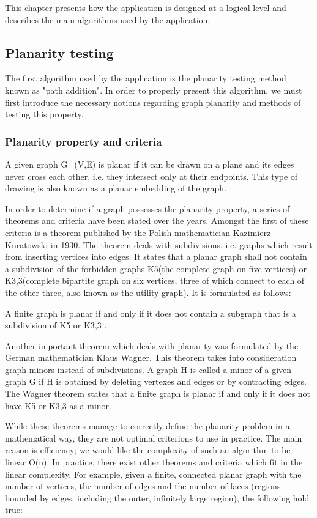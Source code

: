 This chapter presents how the application is designed at a logical level and describes the 
main algorithms used by the application.

\subsection{Planarity testing}

The first algorithm used by the application is the planarity testing method known as "path addition". In 
order to properly present this algorithm, we must first introduce the necessary notions regarding graph planarity 
and methods of testing this property.

\subsubsection{Planarity property and criteria}

A given graph G=(V,E) is planar if it can be drawn on a plane and its edges never cross each other, i.e. they 
intersect only at their endpoints. This type of drawing is also known as a planar embedding of the graph.

In order to determine if a graph possesses the planarity property, a series of theorems and criteria have been 
stated over the years. Amongst the first of these criteria is a theorem published by the Polish mathematician 
Kazimierz Kuratowski in 1930. The theorem deals with subdivisions, i.e. graphs which result from inserting vertices 
into edges. It states that a planar graph shall not contain a subdivision of the forbidden graphs K5(the complete 
graph on five vertices) or K3,3(complete bipartite graph on six vertices, three of which connect to each of the other 
three, also known as the utility graph). It is formulated as follows:

A finite graph is planar if and only if it does not contain a subgraph that is a subdivision of K5 or K3,3 .

Another important theorem which deals with planarity was formulated by the German mathematician Klaus Wagner. 
This theorem takes into consideration graph minors instead of subdivisions. A graph H is called a minor of a given 
graph G if H is obtained by deleting vertexes and edges or by contracting edges. The Wagner theorem states that 
a finite graph is planar if and only if it does not have K5 or K3,3 as a minor.

While these theorems manage to correctly define the planarity problem in a mathematical way, they are not optimal 
criterions to use in practice. The main reason is efficiency; we would like the complexity of such an algorithm 
to be linear O(n). In practice, there exist other theorems and criteria which fit in the linear complexity. For 
example, given a finite, connected planar graph with \iv the number of vertices, \ie the number of edges and 
\if the number of faces (regions bounded by edges, including the outer, infinitely large region), the following 
hold true:

